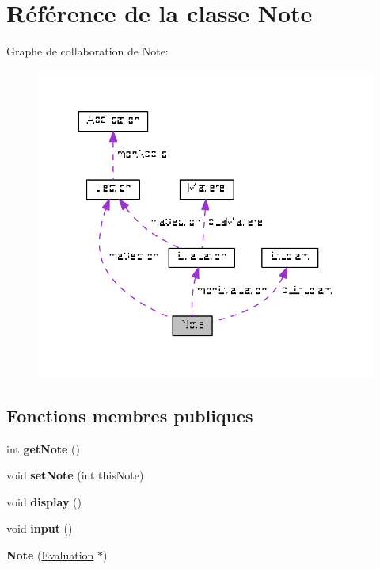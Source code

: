\hypertarget{class_note}{\section{Référence de la classe Note}
\label{class_note}
}


Graphe de collaboration de Note\+:
\nopagebreak
\begin{figure}[H]
\begin{center}
\leavevmode
\includegraphics[width=330pt]{class_note__coll__graph}
\end{center}
\end{figure}
\subsection*{Fonctions membres publiques}
\begin{DoxyCompactItemize}
\item 
\hypertarget{class_note_a880f020b1e9fe974fd2a3064af3257c6}{int {\bfseries get\+Note} ()}\label{class_note_a880f020b1e9fe974fd2a3064af3257c6}

\item 
\hypertarget{class_note_a2624f81d3da32203d65804d4c0d7379e}{void {\bfseries set\+Note} (int this\+Note)}\label{class_note_a2624f81d3da32203d65804d4c0d7379e}

\item 
\hypertarget{class_note_aa2e4741a587cc0f44127e722e3dd6d6f}{void {\bfseries display} ()}\label{class_note_aa2e4741a587cc0f44127e722e3dd6d6f}

\item 
\hypertarget{class_note_a60e3344a645763b9bac160249e202206}{void {\bfseries input} ()}\label{class_note_a60e3344a645763b9bac160249e202206}

\item 
\hypertarget{class_note_a9e1747b439abeb626890a646f7c17a8d}{{\bfseries Note} (\hyperlink{class_evaluation}{Evaluation} $\ast$)}\label{class_note_a9e1747b439abeb626890a646f7c17a8d}

\end{DoxyCompactItemize}

